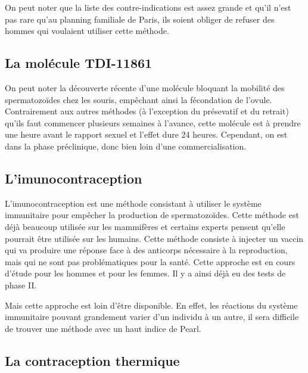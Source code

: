 \documentclass[12pt,a4paper]{report}
\begin{document}
On peut noter que la liste des contre-indications est assez grande et qu'il n'est pas rare qu'au planning familiale de Paris, ils soient obliger de refuser des hommes qui voulaient utiliser cette méthode. \cites{guillaumedaudinContraceptesEnqueteDernier2022}

\subsection{La molécule TDI-11861}

On peut noter la découverte récente d'une molécule bloquant la mobilité des spermatozoïdes chez les souris, empêchant ainsi la fécondation de l'ovule.
Contrairement aux autres méthodes (à l'exception du présevatif et du retrait) qu'ils faut commencer plusieurs semaines à l'avance, cette molécule est à prendre une heure avant le rapport sexuel et l'effet dure 24 heures. \cite{balbachOndemandMaleContraception2023}
Cependant, on est dans la phase préclinique, donc bien loin d'une commercialisation. \cite{DeveloppementMedicamentInserm}

\subsection{L'imunocontraception} \label{section:imunocontraception}

L'imunocontraception est une méthode consistant à utiliser le système immunitaire pour empêcher la production de spermatozoïdes.
Cette méthode est déjà beaucoup utilisée sur les mammifères et certains experts pensent qu'elle pourrait être utilisée sur les humains. \cite{ImmunocontraceptionWikipedia}
Cette méthode consiste à injecter un vaccin qui va produire une réponse face à des anticorps nécessaire à la reproduction, mais qui ne sont pas problématiques pour la santé.
Cette approche est en cours d'étude pour les hommes et pour les femmes. Il y a ainsi déjà eu des tests de phase II. \cite{mclaughlinThereRoleImmunocontraception2011}

Mais cette approche est loin d'être disponible. En effet, les réactions du système immunitaire pouvant grandement varier d'un individu à un autre, il sera difficile de trouver une méthode avec un haut indice de Pearl. \cite{mclaughlinThereRoleImmunocontraception2011}

\subsection{La contraception thermique} \label{section:thermique}
\end{document}

